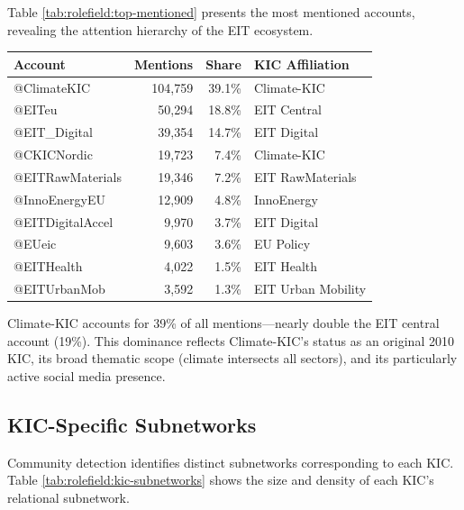 \documentclass[../main.tex]{subfiles}
\begin{document}
Table \ref{tab:rolefield:top-mentioned} presents the most mentioned accounts, revealing the attention hierarchy of the EIT ecosystem.

\begin{center}
\small
\begin{tabular}{lrrl}
\toprule
\textbf{Account} & \textbf{Mentions} & \textbf{Share} & \textbf{KIC Affiliation} \\
\midrule
@ClimateKIC & 104,759 & 39.1\% & Climate-KIC \\
@EITeu & 50,294 & 18.8\% & EIT Central \\
@EIT\_Digital & 39,354 & 14.7\% & EIT Digital \\
@CKICNordic & 19,723 & 7.4\% & Climate-KIC \\
@EITRawMaterials & 19,346 & 7.2\% & EIT RawMaterials \\
@InnoEnergyEU & 12,909 & 4.8\% & InnoEnergy \\
@EITDigitalAccel & 9,970 & 3.7\% & EIT Digital \\
@EUeic & 9,603 & 3.6\% & EU Policy \\
@EITHealth & 4,022 & 1.5\% & EIT Health \\
@EITUrbanMob & 3,592 & 1.3\% & EIT Urban Mobility \\
\bottomrule
\end{tabular}
\end{center}

\begin{insightbox}
Climate-KIC accounts for 39\% of all mentions---nearly double the EIT central account (19\%). This dominance reflects Climate-KIC's status as an original 2010 KIC, its broad thematic scope (climate intersects all sectors), and its particularly active social media presence.
\end{insightbox}

\subsection{KIC-Specific Subnetworks}

Community detection identifies distinct subnetworks corresponding to each KIC. Table \ref{tab:rolefield:kic-subnetworks} shows the size and density of each KIC's relational subnetwork.
\end{document}

